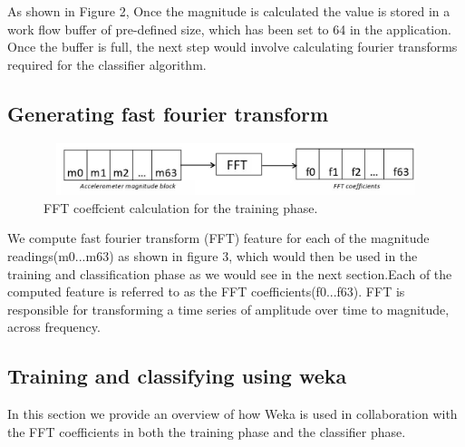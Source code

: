 \documentclass[conference]{IEEEtran}
\begin{document}
As shown in Figure 2, Once the magnitude is calculated the value is stored in a work flow buffer of pre-defined size, which has been set to 64 in the application. Once the buffer is full, the next step would involve calculating fourier transforms required for the classifier algorithm.

\subsection{Generating fast fourier transform}

\begin{figure}
\centering
  \includegraphics[width=5in,height=0.6in]{magnitude_to_fft.pdf}
  \caption{FFT coeffcient calculation for the training phase.}
\end{figure}

We compute fast fourier transform (FFT) feature for each of the magnitude readings(m0...m63) as shown in figure 3, which would then be used in the training and classification phase as we would see in the next section.Each of the computed feature is referred to as the FFT coefficients(f0...f63). FFT is responsible for transforming a time series of amplitude over time to magnitude, across frequency.

\subsection{Training and classifying using weka}

In this section we provide an overview of how Weka is used in collaboration with the FFT coefficients in both the training phase and the classifier phase.
\end{document}
